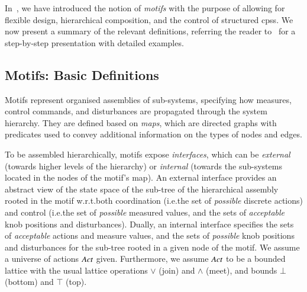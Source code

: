\documentclass[runningheads]{llncs}
\makeatletter
\newcommand{\ie}[1][\@ ]{i.e.{#1}}
\newcommand{\wrt}{w.r.t.\@ }
\newcommand{\actionuniverse}[1][]{\mathit{Act}\ifx#1\relax\else^{#1}\fi}
\makeatother
\begin{document}
In~\cite{BCK26-Motifs}, we have introduced the notion of \emph{motifs} with the purpose of allowing for flexible design, hierarchical composition, and the control of structured \glspl{cps}.  We now present a summary of the relevant definitions, referring the reader to~\cite{BCK26-Motifs} for a step-by-step presentation with detailed examples.

\subsection{Motifs: Basic Definitions}
\label{secn:motif-defs}

Motifs represent organised assemblies of sub-systems, specifying how measures, control commands, and disturbances are propagated through the system hierarchy. They are defined based on \emph{maps}, which are directed graphs with predicates used to convey additional information on the types of nodes and edges.

To be assembled hierarchically, motifs expose \emph{interfaces}, which can be \emph{external} (towards higher levels of the hierarchy) or \emph{internal} (towards the sub-systems located in the nodes of the motif's map). An external interface provides an abstract view of the state space of the sub-tree of the hierarchical assembly rooted in the motif \wrt both coordination (\ie the set of \emph{possible} discrete actions) and control (\ie the set of \emph{possible} measured values, and the sets of \emph{acceptable} knob positions and disturbances). Dually, an internal interface specifies the sets of \emph{acceptable} actions and measure values, and the sets of \emph{possible} knob positions and disturbances for the sub-tree rooted in a given node of the motif.
We assume a universe of actions $\actionuniverse$ given. Furthermore, we assume $\actionuniverse$ to be a bounded lattice with the usual lattice operations $\lor$ (join) and $\land$ (meet), and bounds $\bot$ (bottom) and $\top$ (top). 
\end{document}
